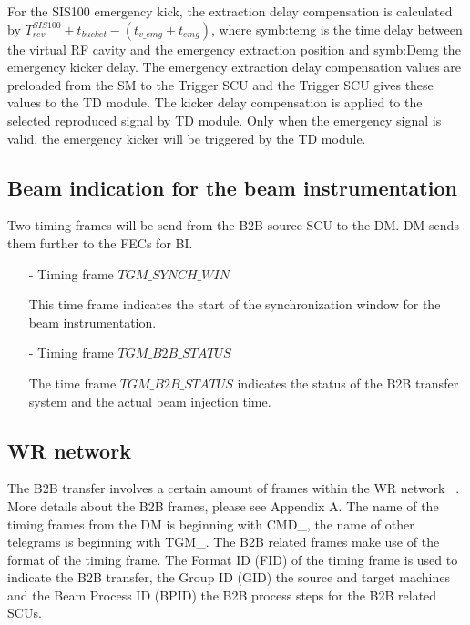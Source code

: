For the SIS100 emergency kick, the extraction delay compensation is calculated by $T_{rev}^{SIS100} + t_{bucket} - (t_{v\_emg} + t_{emg})$, where \gls{symb:temg} is the time delay between the virtual RF cavity and the emergency extraction position and \gls{symb:Demg} the emergency kicker delay. The emergency extraction delay compensation values are preloaded from the SM to the Trigger SCU and the Trigger SCU gives these values to the TD module. The kicker delay compensation is applied to the selected reproduced signal by TD module. Only when the emergency signal is valid, the emergency kicker will be triggered by the TD module.


\subsection{Beam indication for the beam instrumentation}

Two timing frames will be send from the B2B source SCU to the DM. DM sends them further to the FECs for BI.
\begin{itemize}
\item[-] Timing frame $TGM\_SYNCH\_WIN$

This time frame indicates the start of the synchronization window for the beam instrumentation.

\item[-] Timing frame $TGM\_B2B\_STATUS$

The time frame $TGM\_B2B\_STATUS$ indicates the status of the B2B transfer system and the actual beam injection time. 
\end{itemize}

\subsection{WR network}

The B2B transfer involves a certain amount of frames within the WR network ~\cite{beck_white_2011}. More details about the B2B frames, please see Appendix A. The name of the timing frames from the DM is beginning with CMD\_, the name of other telegrams is beginning with TGM\_. The B2B related frames make use of the format of the timing frame. The Format ID (\gls{FID}) of the timing frame is used to indicate the B2B transfer, the Group ID (\gls{GID}) the source and target machines and the Beam Process ID (\gls{BPID}) the B2B process steps for the B2B related SCUs. 

